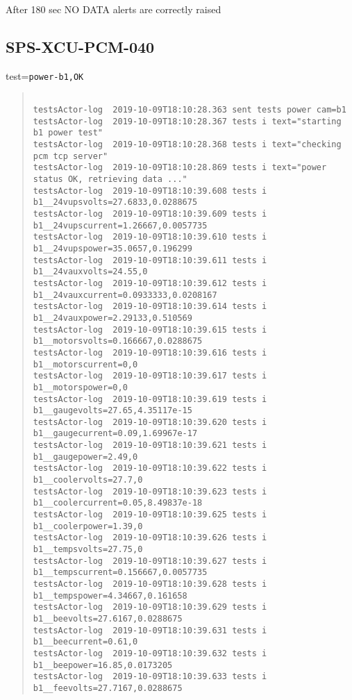 \noindent After 180 sec NO DATA alerts are correctly raised


\subsection{SPS-XCU-PCM-040}
\label{sec:tc-040}


test=\texttt{power-b1,OK}
\begin{quote}
\begin{tiny}
\begin{verbatim}

testsActor-log  2019-10-09T18:10:28.363 sent tests power cam=b1
testsActor-log  2019-10-09T18:10:28.367 tests i text="starting b1 power test"
testsActor-log  2019-10-09T18:10:28.368 tests i text="checking pcm tcp server"
testsActor-log  2019-10-09T18:10:28.869 tests i text="power status OK, retrieving data ..."
testsActor-log  2019-10-09T18:10:39.608 tests i b1__24vupsvolts=27.6833,0.0288675
testsActor-log  2019-10-09T18:10:39.609 tests i b1__24vupscurrent=1.26667,0.0057735
testsActor-log  2019-10-09T18:10:39.610 tests i b1__24vupspower=35.0657,0.196299
testsActor-log  2019-10-09T18:10:39.611 tests i b1__24vauxvolts=24.55,0
testsActor-log  2019-10-09T18:10:39.612 tests i b1__24vauxcurrent=0.0933333,0.0208167
testsActor-log  2019-10-09T18:10:39.614 tests i b1__24vauxpower=2.29133,0.510569
testsActor-log  2019-10-09T18:10:39.615 tests i b1__motorsvolts=0.166667,0.0288675
testsActor-log  2019-10-09T18:10:39.616 tests i b1__motorscurrent=0,0
testsActor-log  2019-10-09T18:10:39.617 tests i b1__motorspower=0,0
testsActor-log  2019-10-09T18:10:39.619 tests i b1__gaugevolts=27.65,4.35117e-15
testsActor-log  2019-10-09T18:10:39.620 tests i b1__gaugecurrent=0.09,1.69967e-17
testsActor-log  2019-10-09T18:10:39.621 tests i b1__gaugepower=2.49,0
testsActor-log  2019-10-09T18:10:39.622 tests i b1__coolervolts=27.7,0
testsActor-log  2019-10-09T18:10:39.623 tests i b1__coolercurrent=0.05,8.49837e-18
testsActor-log  2019-10-09T18:10:39.625 tests i b1__coolerpower=1.39,0
testsActor-log  2019-10-09T18:10:39.626 tests i b1__tempsvolts=27.75,0
testsActor-log  2019-10-09T18:10:39.627 tests i b1__tempscurrent=0.156667,0.0057735
testsActor-log  2019-10-09T18:10:39.628 tests i b1__tempspower=4.34667,0.161658
testsActor-log  2019-10-09T18:10:39.629 tests i b1__beevolts=27.6167,0.0288675
testsActor-log  2019-10-09T18:10:39.631 tests i b1__beecurrent=0.61,0
testsActor-log  2019-10-09T18:10:39.632 tests i b1__beepower=16.85,0.0173205
testsActor-log  2019-10-09T18:10:39.633 tests i b1__feevolts=27.7167,0.0288675

\end{verbatim}
\end{tiny}
\end{quote}
